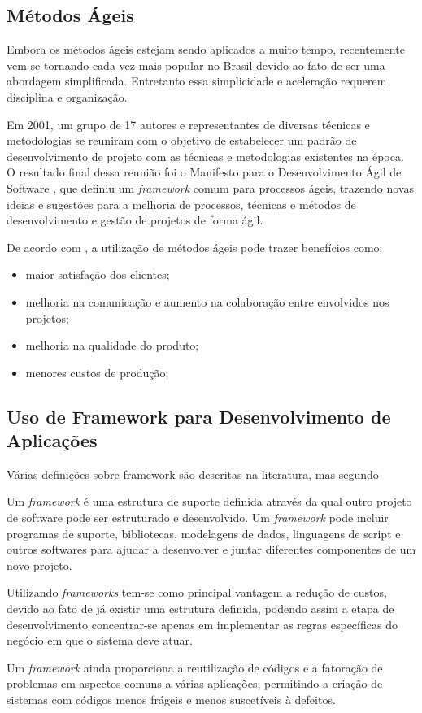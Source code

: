 \subsection{Métodos Ágeis}

Embora os métodos ágeis estejam sendo aplicados a muito tempo, recentemente vem se tornando cada vez mais popular no Brasil devido ao fato de ser uma abordagem simplificada. Entretanto essa simplicidade e aceleração requerem disciplina e organização.

Em 2001, um grupo de 17 autores e representantes de diversas técnicas e metodologias se reuniram com o objetivo de estabelecer um padrão de desenvolvimento de projeto com as técnicas e metodologias existentes na época. O resultado final dessa reunião foi o Manifesto para o Desenvolvimento Ágil de Software \cite{beck2001manifesto}, que definiu um \textit{framework} comum para processos ágeis, trazendo novas ideias e sugestões para a melhoria de processos, técnicas e métodos de desenvolvimento e gestão de projetos de forma ágil.

De acordo com \cite{pressman2016engenharia}, a utilização de métodos ágeis pode trazer benefícios como: 
\begin{itemize}
    \item maior satisfação dos clientes;
    \item melhoria na comunicação e aumento na colaboração entre envolvidos nos projetos;
    \item melhoria na qualidade do produto;
    \item menores custos de produção;
\end{itemize} 

\subsection{Uso de Framework para Desenvolvimento de Aplicações}

Várias definições sobre framework são descritas na literatura, mas segundo \cite{gammapadroes} 

Um \textit{framework} é uma estrutura de suporte definida através da qual outro projeto de software pode ser estruturado e desenvolvido. Um
\textit{framework} pode incluir programas de suporte, bibliotecas, modelagens de dados, linguagens de script e outros softwares para ajudar a desenvolver e juntar diferentes componentes de um novo projeto. 

Utilizando \textit{frameworks} tem-se como principal vantagem a redução de custos, devido ao fato de já existir uma estrutura definida, podendo assim a etapa de desenvolvimento concentrar-se apenas em implementar as regras específicas do negócio em que o sistema deve atuar. 

Um \textit{framework} ainda proporciona a reutilização de códigos e a fatoração de problemas em aspectos comuns a várias aplicações, permitindo a criação de sistemas com códigos menos frágeis e menos suscetíveis à defeitos. 